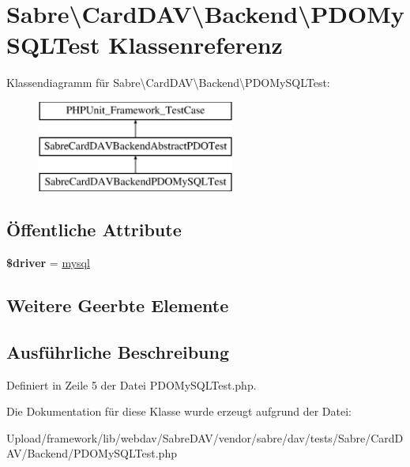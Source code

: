 \hypertarget{class_sabre_1_1_card_d_a_v_1_1_backend_1_1_p_d_o_my_s_q_l_test}{}\section{Sabre\textbackslash{}Card\+D\+AV\textbackslash{}Backend\textbackslash{}P\+D\+O\+My\+S\+Q\+L\+Test Klassenreferenz}
\label{class_sabre_1_1_card_d_a_v_1_1_backend_1_1_p_d_o_my_s_q_l_test}
Klassendiagramm für Sabre\textbackslash{}Card\+D\+AV\textbackslash{}Backend\textbackslash{}P\+D\+O\+My\+S\+Q\+L\+Test\+:\begin{figure}[H]
\begin{center}
\leavevmode
\includegraphics[height=3.000000cm]{class_sabre_1_1_card_d_a_v_1_1_backend_1_1_p_d_o_my_s_q_l_test}
\end{center}
\end{figure}
\subsection*{Öffentliche Attribute}
\begin{DoxyCompactItemize}
\item 
\mbox{\label{class_sabre_1_1_card_d_a_v_1_1_backend_1_1_p_d_o_my_s_q_l_test_a6962881a63cdf3a48825432946198022}} 
{\bfseries \$driver} = \textquotesingle{}\mbox{\hyperlink{classmysql}{mysql}}\textquotesingle{}
\end{DoxyCompactItemize}
\subsection*{Weitere Geerbte Elemente}


\subsection{Ausführliche Beschreibung}


Definiert in Zeile 5 der Datei P\+D\+O\+My\+S\+Q\+L\+Test.\+php.



Die Dokumentation für diese Klasse wurde erzeugt aufgrund der Datei\+:\begin{DoxyCompactItemize}
\item 
Upload/framework/lib/webdav/\+Sabre\+D\+A\+V/vendor/sabre/dav/tests/\+Sabre/\+Card\+D\+A\+V/\+Backend/P\+D\+O\+My\+S\+Q\+L\+Test.\+php\end{DoxyCompactItemize}
